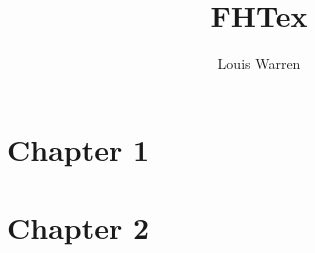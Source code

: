 \documentclass[a4paper]{report}
\begin{document}
\title{FHTex}
\author{Louis Warren}
\maketitle

\tableofcontents

\chapter{Chapter 1}




\chapter{Chapter 2}



\end{document}
